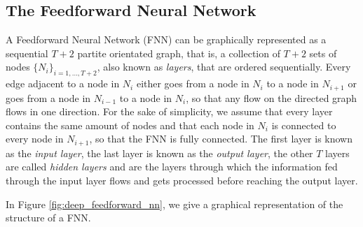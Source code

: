 \documentclass{article}
\begin{document}
\subsection{The Feedforward Neural Network}

% 
A Feedforward Neural Network (FNN) can be graphically represented as a sequential $T+2$ partite orientated graph, that is, a collection of $T+2$ sets of nodes $\{N_i\}_{i=1,\dots,T+2}$, also known as \textit{layers}, that are ordered sequentially.
% 
Every edge adjacent to a node in $N_i$ either goes from a node in $N_i$ to a node in $N_{i+1}$ or goes from a node in $N_{i-1}$ to a node in $N_i$, so that any flow on the directed graph flows in one direction.
% 
For the sake of simplicity, we assume that every layer contains the same amount of nodes and that each node in $N_i$ is connected to every node in $N_{i+1}$, so that the FNN is fully connected.
% 
The first layer is known as the \textit{input layer}, the last layer is known as the \textit{output layer}, the other $T$ layers are called \textit{hidden layers} and are the layers through which the information fed through the input layer flows and gets processed before reaching the output layer.
% 

% 
In Figure \ref{fig:deep_feedforward_nn}, we give a graphical representation of the structure of a FNN.
% 
\end{document}
